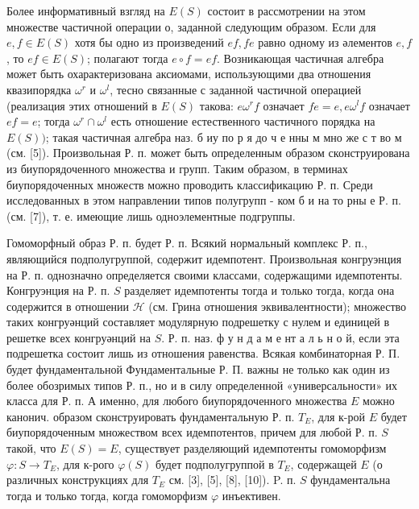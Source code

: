 \documentclass[10pt]{article}
\begin{document}
Более информативный взгляд на $E(S)$ состоит в рассмотрении на этом множестве частичной операции о, заданной следующим образом. Если для $e, f \in E(S)$ хотя бы одно из произведений $e f, f e$ равно одному из әлементов $e, f$, то $e f \in E(S)$; полагают тогда $e \circ f=e f$. Возникающая частичная алгебра может быть охарактеризована аксиомами, использующими два отношения квазипорядка $\omega^{r}$ и $\omega^{l}$, тесно связанные с заданной частичной операцией (реализация этих отношений в $E(S)$ такова: $e \omega^{r} f$ означает $f e=e, e \omega^{l} f$ означает $e f=e$; тогда $\omega^{r} \cap \omega^{l}$ есть отношение естественного частичного порядка на $E(S))$; такая частичная алгебра наз. б иу по р я до ч е нны м мно же с т во м (см. [5]). Произвольная Р. п. может быть определенным образом сконструирована из биупорядоченного множества и групп. Таким образом, в терминах биупорядоченных множеств можно проводить классификацию Р. п. Среди исследованных в этом направлении типов полугрупп - ком б и на то рны е Р. п. (см. [7]), т. е. имеющие лишь одноэлементные подгруппы.



Гомоморфный образ Р. п. будет Р. п. Всякий нормальный комплекс Р. п., являющийся подполугруппой, содержит идемпотент. Произвольная конгруэнция на Р. п. однозначно определяется своими классами, содержащими идемпотенты. Конгруэнция на Р. п. $S$ разделяет идемпотенты тогда и только тогда, когда она содержится в отношении $\mathscr{H}$ (см. Грина отношения эквивалентности); множество таких конгруәнций составляет модулярную подрешетку с нулем и единицей в решетке всех конгруәнций на $S$. Р. п. наз. ф у н д а м е нт а л ь н о й, если эта подрешетка состоит лишь из отношения равенства. Всякая комбинаторная Р. П. будет фундаментальной Фундаментальные Р. П. важны не только как один из более обозримых типов Р. п., но и в силу определенной «универсальности» их класса для Р. п. А именно, для любого биупорядоченного множества $E$ можно канонич. образом сконструировать фундаментальную Р. п. $T_{E}$, для к-рой $E$ будет биупорядоченным множеством всех идемпотентов, причем для любой Р. п. $S$ такой, что $E(S)=E$, существует разделяющий идемпотенты гомоморфизм $\varphi: S \rightarrow T_{E}$, для к-рого $\varphi(S)$ будет подполугруппой в $T_{E}$, содержащей $E$ (о различных конструкциях для $T_{E}$ см. [3], [5], [8], [10]). P. п. $S$ фундаментальна тогда и только тогда, когда гомоморфизм $\varphi$ инъективен.
\end{document}
